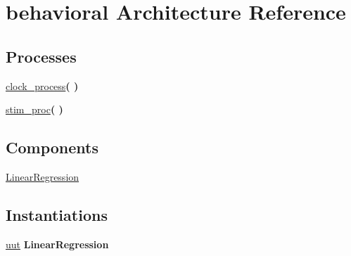\hypertarget{classautomatic__tb_1_1behavioral}{\section{behavioral Architecture Reference}
\label{classautomatic__tb_1_1behavioral}
}
\subsection*{Processes}
 \begin{DoxyCompactItemize}
\item 
\hyperlink{classautomatic__tb_1_1behavioral_ac0731c1f0a226305f2a590b4044cdccb}{clock\+\_\+process}{\bfseries  (  )}
\item 
\hyperlink{classautomatic__tb_1_1behavioral_ad2efa6785cff833c341e27596b21aeb5}{stim\+\_\+proc}{\bfseries  (  )}
\end{DoxyCompactItemize}
\subsection*{Components}
 \begin{DoxyCompactItemize}
\item 
\hyperlink{classautomatic__tb_1_1behavioral_a899499ba78b32b936cd0914831a72c95}{Linear\+Regression}  {\bfseries }  
\end{DoxyCompactItemize}
\subsection*{Instantiations}
 \begin{DoxyCompactItemize}
\item 
\hyperlink{classautomatic__tb_1_1behavioral_a1619316ad715601eb5d3559db829ac05}{uut}  {\bfseries Linear\+Regression}   
\end{DoxyCompactItemize}


